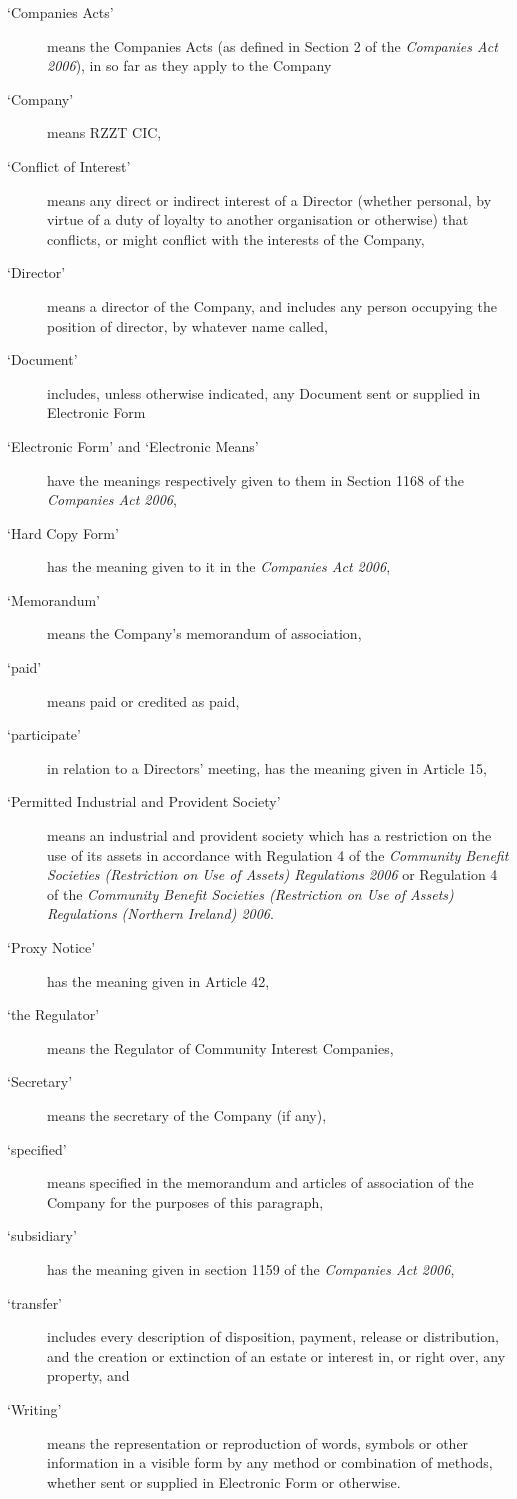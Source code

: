 \documentclass[a4paper,12pt]{article}
\begin{document}
\begin{description}
  \item[`Companies Acts'] means the Companies Acts (as defined in Section 2 of the \textit{Companies Act 2006}), in so far as they apply to the Company
  \item[`Company'] means RZZT CIC,
  \item[`Conflict of Interest'] means any direct or indirect interest of a Director (whether personal, by virtue of a duty of loyalty to another organisation or otherwise) that conflicts, or might conflict with the interests of the Company,
  \item[`Director'] means a director of the Company, and includes any person occupying the position of director, by whatever name called,
  \item[`Document'] includes, unless otherwise indicated, any Document sent or supplied in Electronic Form
  \item[`Electronic Form' and `Electronic Means'] have the meanings respectively given to them in Section 1168 of the \textit{Companies Act 2006},
  \item[`Hard Copy Form'] has the meaning given to it in the \textit{Companies Act 2006},
  \item[`Memorandum'] means the Company's memorandum of association,
  \item[`paid'] means paid or credited as paid,
  \item[`participate'] in relation to a Directors' meeting, has the meaning given in Article 15,
  \item[`Permitted Industrial and Provident Society'] means an industrial and provident society which has a restriction on the use of its assets in accordance with Regulation 4 of the \textit{Community Benefit Societies (Restriction on Use of Assets) Regulations 2006} or Regulation 4 of the \textit{Community Benefit Societies (Restriction on Use of Assets) Regulations (Northern Ireland) 2006}.
  \item[`Proxy Notice'] has the meaning given in Article 42,
  \item[`the Regulator'] means the Regulator of Community Interest Companies,
  \item[`Secretary'] means the secretary of the Company (if any),
  \item[`specified'] means specified in the memorandum and articles of association of the Company for the purposes of this paragraph,
  \item[`subsidiary'] has the meaning given in section 1159 of the \textit{Companies Act 2006},
  \item[`transfer'] includes every description of disposition, payment, release or distribution, and the creation or extinction of an estate or interest in, or right over, any property, and
  \item[`Writing'] means the representation or reproduction of words, symbols or other information in a visible form by any method or combination of methods, whether sent or supplied in Electronic Form or otherwise.
\end{description}
\end{document}
